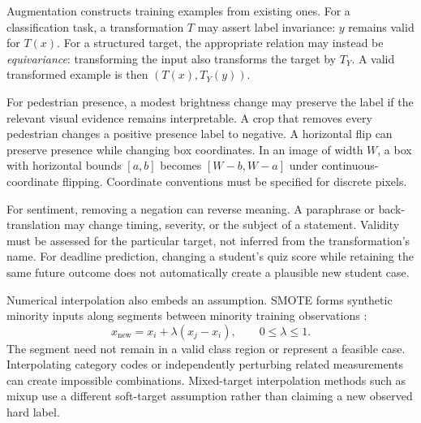 Augmentation constructs training examples from existing ones. For a classification task, a transformation $T$ may assert label invariance: $y$ remains valid for $T(x)$. For a structured target, the appropriate relation may instead be \emph{equivariance}: transforming the input also transforms the target by $T_Y$. A valid transformed example is then $(T(x),T_Y(y))$.

\par\addvspace{\intextsep}\noindent\begin{minipage}{\linewidth}
\centering
{}
\label{fig:augmentation-target-map}
\end{minipage}\par\addvspace{\intextsep}

For pedestrian presence, a modest brightness change may preserve the label if the relevant visual evidence remains interpretable. A crop that removes every pedestrian changes a positive presence label to negative. A horizontal flip can preserve presence while changing box coordinates. In an image of width $W$, a box with horizontal bounds $[a,b]$ becomes $[W-b,W-a]$ under continuous-coordinate flipping. Coordinate conventions must be specified for discrete pixels.

For sentiment, removing a negation can reverse meaning. A paraphrase or back-translation may change timing, severity, or the subject of a statement. Validity must be assessed for the particular target, not inferred from the transformation's name. For deadline prediction, changing a student's quiz score while retaining the same future outcome does not automatically create a plausible new student case.

Numerical interpolation also embeds an assumption. SMOTE forms synthetic minority inputs along segments between minority training observations \citep{chawla2002}:
\[
x_{\mathrm{new}}=x_i+\lambda(x_j-x_i),\qquad0\le\lambda\le1.
\]
The segment need not remain in a valid class region or represent a feasible case. Interpolating category codes or independently perturbing related measurements can create impossible combinations. Mixed-target interpolation methods such as mixup use a different soft-target assumption rather than claiming a new observed hard label.


